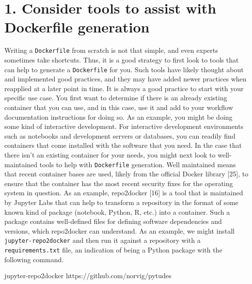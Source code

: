 \documentclass[10pt,letterpaper]{article}
\newenvironment{Shaded}{\begin{snugshade}}{\end{snugshade}}
\newcommand{\ExtensionTok}[1]{#1}
\newcommand{\NormalTok}[1]{#1}
\begin{document}
\hypertarget{consider-tools-to-assist-with-dockerfile-generation}{%
\section*{1. Consider tools to assist with Dockerfile
generation}\label{consider-tools-to-assist-with-dockerfile-generation}}

  \label{rule:tools} 

Writing a \texttt{Dockerfile} from scratch is not that simple, and even
experts sometimes take shortcuts. Thus, it is a good strategy to first
look to tools that can help to generate a \texttt{Dockerfile} for you.
Such tools have likely thought about and implemented good practices, and
they may have added newer practices when reapplied at a later point in
time. It is always a good practice to start with your specific use case.
You first want to determine if there is an already existing container
that you can use, and in this case, use it and add to your workflow
documentation instructions for doing so. As an example, you might be
doing some kind of interactive development. For interactive development
environments such as notebooks and development servers or databases, you
can readily find containers that come installed with the software that
you need. In the case that there isn't an existing container for your
needs, you might next look to well-maintained tools to help with
\texttt{Dockerfile} generation. Well maintained means that recent
container bases are used, likely from the official Docker library
{[}25{]}, to ensure that the container has the most recent security
fixes for the operating system in question. As an example, repo2docker
{[}16{]} is a tool that is maintained by Jupyter Labs that can help to
transform a repository in the format of some known kind of package
(notebook, Python, R, etc.) into a container. Such a package contains
well-defined files for defining software dependencies and versions,
which repo2docker can understand. As an example, we might install
\texttt{jupyter-repo2docker} and then run it against a repository with a
\texttt{requirements.txt} file, an indication of being a Python package
with the following command.

\begin{Shaded}
\begin{Highlighting}[]
\ExtensionTok{jupyter-repo2docker}\NormalTok{ https://github.com/norvig/pytudes}
\end{Highlighting}
\end{Shaded}
\end{document}
